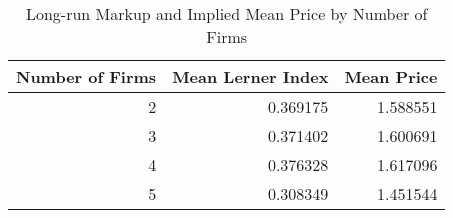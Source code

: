 \begin{table}
\caption{Long-run Markup and Implied Mean Price by Number of Firms}
\label{tab:longrun_markup}
\begin{tabular}{rrr}
\toprule
Number of Firms & Mean Lerner Index & Mean Price \\
\midrule
2 & 0.369175 & 1.588551 \\
3 & 0.371402 & 1.600691 \\
4 & 0.376328 & 1.617096 \\
5 & 0.308349 & 1.451544 \\
\bottomrule
\end{tabular}
\end{table}
